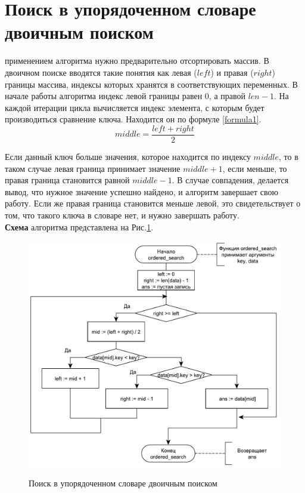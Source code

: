 \newpage
\section{Поиск в упорядоченном словаре двоичным поиском}
 применением алгоритма нужно предварительно отсортировать массив.
В двоичном поиске вводятся такие понятия как левая ($left$) и правая ($right$) границы массива, индексы которых хранятся в соответствующих переменных. В начале работы алгоритма индекс левой границы равен 0, а правой $len - 1$. На каждой итерации цикла вычисляется индекс элемента, с которым будет производиться сравнение ключа. Находится он по формуле \ref{formula1}.
\begin{equation}\label{formula1}
	middle = \frac{left + right}{2}
\end{equation} 

Если данный ключ больше значения, которое находится по индексу $middle$, то в таком случае левая граница принимает значение $middle + 1$, если меньше, то правая граница становится равной $middle - 1$. В случае совпадения, делается вывод, что нужное значение успешно найдено, и алгоритм завершает свою работу. Если же правая граница становится меньше левой, это свидетельствует о том, что такого ключа в словаре нет, и нужно завершать работу.\\

\textbf{Схема} алгоритма представлена на Рис.\ref{fig2:image}.
\begin{figure}[h]
	\begin{center}
		{\includegraphics[scale = 0.6]{schemes/sort}}
		\caption{Поиск в упорядоченном словаре двоичным поиском}
		\label{fig2:image}
	\end{center}
\end{figure}


